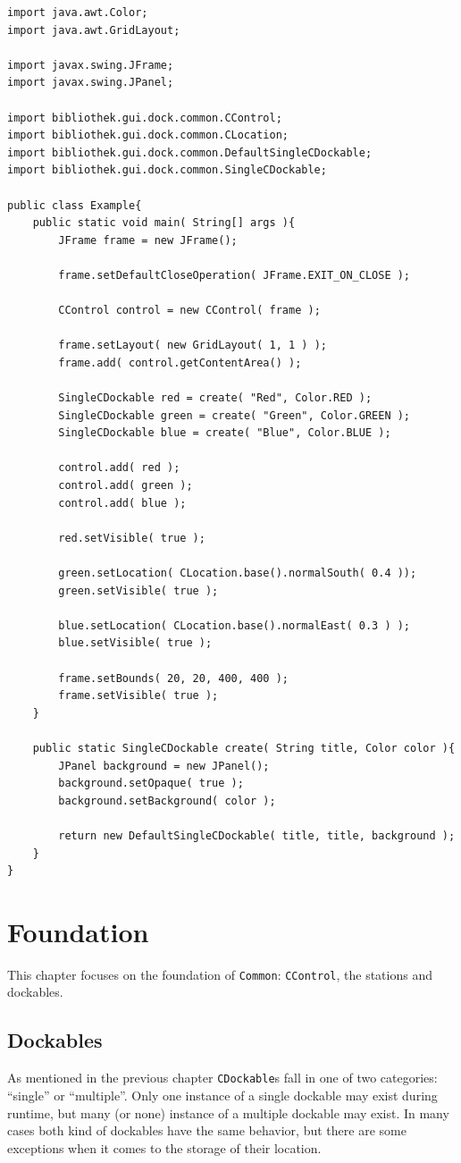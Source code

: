 \documentclass[a4paper,10pt]{article}
\newcommand{\src}[1]{\texttt{#1}}
\begin{document}
\begin{lstlisting}
import java.awt.Color;
import java.awt.GridLayout;

import javax.swing.JFrame;
import javax.swing.JPanel;

import bibliothek.gui.dock.common.CControl;
import bibliothek.gui.dock.common.CLocation;
import bibliothek.gui.dock.common.DefaultSingleCDockable;
import bibliothek.gui.dock.common.SingleCDockable;

public class Example{
	public static void main( String[] args ){
		JFrame frame = new JFrame();
		
		frame.setDefaultCloseOperation( JFrame.EXIT_ON_CLOSE );
		
		CControl control = new CControl( frame );
		
		frame.setLayout( new GridLayout( 1, 1 ) );
		frame.add( control.getContentArea() );
		
		SingleCDockable red = create( "Red", Color.RED );
		SingleCDockable green = create( "Green", Color.GREEN );
		SingleCDockable blue = create( "Blue", Color.BLUE );
		
		control.add( red );
		control.add( green );
		control.add( blue );
		
		red.setVisible( true );
		
		green.setLocation( CLocation.base().normalSouth( 0.4 ));
		green.setVisible( true );
		
		blue.setLocation( CLocation.base().normalEast( 0.3 ) );
		blue.setVisible( true );
		
		frame.setBounds( 20, 20, 400, 400 );
		frame.setVisible( true );
	}
	
	public static SingleCDockable create( String title, Color color ){
		JPanel background = new JPanel();
		background.setOpaque( true );
		background.setBackground( color );
		
		return new DefaultSingleCDockable( title, title, background );
	}
}

\end{lstlisting}

\section{Foundation}
This chapter focuses on the foundation of \src{Common}: \src{CControl}, the stations and dockables.

\subsection{Dockables}
As mentioned in the previous chapter \src{CDockable}s fall in one of two categories: ``single'' or ``multiple''. Only one instance of a single dockable may exist during runtime, but many (or none) instance of a multiple dockable may exist. In many cases both kind of dockables have the same behavior, but there are some exceptions when it comes to the storage of their location.
\end{document}
